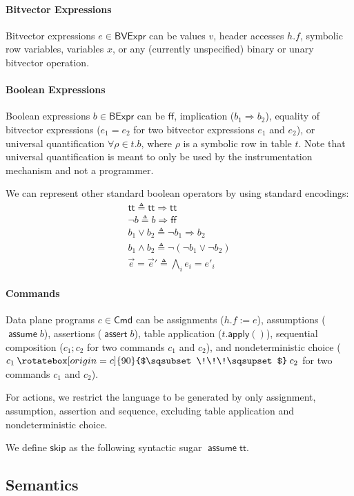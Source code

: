 \documentclass{article}
\newcommand{\TRUE}{\mathsf{tt}}
\newcommand{\FALSE}{\mathsf{ff}}
\newcommand{\BVExpr}{\mathsf{BVExpr}}
\newcommand{\BExpr}{\mathsf{BExpr}}
\newcommand{\assert}{\mathop{\mathsf{assert}}}
\newcommand{\assume}{\mathop{\mathsf{assume}}}
\newcommand{\apply}{\mathsf{apply}}
\newcommand{\choice}{\mathbin{\rotatebox[origin=c]{90}{$\sqsubset\!\!\!\sqsupset$}}}
\newcommand{\SKIP}{\mathsf{skip}}
\begin{document}
\paragraph{Bitvector Expressions}
Bitvector expressions $e \in \BVExpr$ can be values $v$, header accesses $h.f$,
symbolic row variables, variables $x$, or any
(currently unspecified) binary or unary bitvector operation.

\paragraph{Boolean Expressions}
Boolean expressions $b \in \BExpr$ can be $\FALSE$, implication ($b_1
\Rightarrow b_2$), equality of bitvector expressions ($e_1 = e_2$ for two
bitvector expressions $e_1$ and $e_2$), or universal quantification $\forall
\rho \in t. b$, where $\rho$ is a symbolic row in table $t$. Note that universal
quantification is meant to only be used by the instrumentation mechanism and not
a programmer.

We can represent other standard boolean operators by using standard encodings:
\[\begin{array}{l}
  \TRUE \triangleq \TRUE \Rightarrow \TRUE \\
  \neg b \triangleq b \Rightarrow \FALSE \\
  b_1 \vee b_2 \triangleq \neg b_1 \Rightarrow b_2 \\
  b_1 \wedge b_2 \triangleq \neg(\neg b_1 \vee \neg b_2) \\
  \vec e = \vec e' \triangleq \bigwedge_i e_i = e'_i
\end{array}\]

\paragraph{Commands}
Data plane programs $c \in \mathsf{Cmd}$ can be assignments ($h.f := e$),
assumptions ($\assume b$), assertions ($\assert b$), table application
($t.\apply()$), sequential composition ($c_1;c_2$ for two commands $c_1$ and
$c_2$), and nondeterministic choice ($c_1 \choice c_2$ for two commands $c_1$
and $c_2$).

For actions, we restrict the language to be generated by only assignment, assumption, assertion and sequence, excluding table application and nondeterministic choice.

We define $\SKIP$ as the following syntactic sugar $\assume \TRUE$.

\subsection{Semantics}
\end{document}

